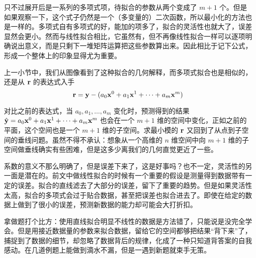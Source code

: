 只不过展开后是一系列的多项式项，待拟合的参数从两个变成了 $m+1$ 个。但是如果观察一下，这个式子仍然是一个（多变量的）二次函数，所以最小化的方法也是一样的。多项式自有多项式的好，能加的项多了，拟合的灵活性也就大了，误差显然会更小。然而与线性拟合相比，它虽然有，但不再像线性拟合一样可以逐项明确说出意义，而是只剩下一堆矩阵运算把这些参数算出来。因此相比于记下公式，形成一个整体上的印象显得尤为重要。

上一小节中，我们从图像看到了这种拟合的几何解释，而多项式拟合也是相似的，还是从 ${\mathbf{r}}$ 的表达式入手
\[
    {\mathbf{r}} = {\mathbf{y}} - (a_0 {\mathbf{x}}^0 + a_1 {\mathbf{x}}^1 + \cdots + a_m {\mathbf{x}}^m)
\]

对比之前的表达式，当 $a_0, a_1, \ldots, a_m$ 变化时，预测得到的结果 $\hat {{\mathbf{y}}} = a_0 {\mathbf{x}}^0 + a_1 {\mathbf{x}}^1 + \cdots + a_m {\mathbf{x}}^m$ 也会在一个 $m + 1$ 维的空间中变化，正如之前的平面，这个空间也是一个 $m + 1$ 维的子空间。求最小模的 ${\mathbf{r}}$ 又回到了从点到子空间的垂线问题。虽然不得不承认：想象从一个高维的 $n$ 维空间中向 $m+1$ 维的子空间做垂线确实有些困难，但是这多少离我们的几何直觉更近了一些。

系数的意义不那么明确了，但是误差下来了，这是好事吗？也不一定，灵活性的另一面是潜在的。前文中做线性拟合的时候有一个重要的假设是测量得到数据带有一定的误差。拟合的直线滤去了大部分的误差，留下了重要的趋势。但是如果灵活性太高，拟合的多项式会过于贴合数据，甚至把误差也拟合进去了。即使在给定的数据上做到了很小的误差，预测新数据的能力却可能会大打折扣。

拿做题打个比方：使用直线拟合明显不线性的数据是方法错了，只能说是没完全学会。但是用接近数据量的参数来拟合数据，留给它的空间都够把结果“背下来”了，捕捉到了数据的细节，却忽略了数据背后的规律，化成了一种只知道背答案的自我感动。在几道例题上能做到滴水不漏，但是一遇到新题就束手无策。

